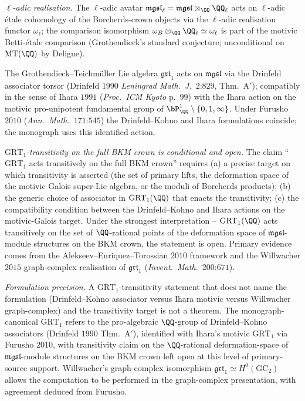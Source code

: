 \begin{theorem}
\emph{$\ell$-adic realisation.} The $\ell$-adic avatar
$\mathfrak{mgsl}_\ell = \mathfrak{mgsl} \otimes_{\QQ} \QQ_\ell$ acts
on $\ell$-adic \'etale cohomology of the Borcherds-crown objects via
the $\ell$-adic realisation functor $\omega_\ell$; the comparison
isomorphism $\omega_B \otimes_\QQ \QQ_\ell \simeq \omega_\ell$ is
part of the motivic Betti-\'etale comparison (Grothendieck's standard
conjecture; unconditional on $\mathrm{MT}(\QQ)$ by Deligne).
\end{theorem}

\begin{theorem}
\label{wn:thm:third-pass-GRT1}

The Grothendieck--Teichm\"uller Lie algebra $\mathfrak{grt}_1$ acts on
$\mathfrak{mgsl}$ via the Drinfeld associator torsor
(Drinfeld $1990$ \emph{Leningrad Math.~J.}~$2$:$829$, Thm.~A$'$);
compatibly in the sense of Ihara $1991$ (\emph{Proc.~ICM Kyoto}
p.~$99$) with the Ihara action on the motivic pro-unipotent
fundamental group of $\bP^1_{\QQ} \setminus \{0, 1, \infty\}$.
Under Furusho $2010$ (\emph{Ann.~Math.}~$171$:$545$) the
Drinfeld--Kohno and Ihara formulations coincide; the monograph uses
this identified action.

\emph{$\mathrm{GRT}_1$-transitivity on the full BKM crown is
conditional and open.} The claim ``$\mathrm{GRT}_1$ acts transitively
on the full BKM crown'' requires (a) a precise target on which
transitivity is asserted (the set of primary lifts, the deformation
space of the motivic Galois super-Lie algebra, or the moduli of
Borcherds products); (b) the generic choice of associator in
$\mathrm{GRT}_1(\QQ)$ that enacts the transitivity; (c) the
compatibility condition between the Drinfeld--Kohno and Ihara actions
on the motivic-Galois target. Under the strongest interpretation --
$\mathrm{GRT}_1(\QQ)$ acts transitively on the set of $\QQ$-rational
points of the deformation space of $\mathfrak{mgsl}$-module structures
on the BKM crown, the statement is open. Primary evidence comes
from the Alekseev--Enriquez--Torossian $2010$ framework and the
Willwacher $2015$ graph-complex realisation of $\mathfrak{grt}_1$
(\emph{Invent.~Math.}~$200$:$671$).

\emph{Formulation precision.} A $\mathrm{GRT}_1$-transitivity statement
that does not name the formulation (Drinfeld--Kohno associator versus
Ihara motivic versus Willwacher graph-complex) and the transitivity
target is not a theorem.  The monograph-canonical
$\mathrm{GRT}_1$ refers to the pro-algebraic $\QQ$-group of
Drinfeld--Kohno associators (Drinfeld $1990$ Thm.~A$'$), identified
with Ihara's motivic $\mathrm{GRT}_1$ via Furusho $2010$, with
transitivity claim on the $\QQ$-rational deformation-space of
$\mathfrak{mgsl}$-module structures on the BKM crown left open at
this level of primary-source support. Willwacher's graph-complex
isomorphism $\mathfrak{grt}_1 \simeq H^0(\mathrm{GC}_2)$ allows the
computation to be performed in the graph-complex presentation, with
agreement deduced from Furusho.
\end{theorem}

